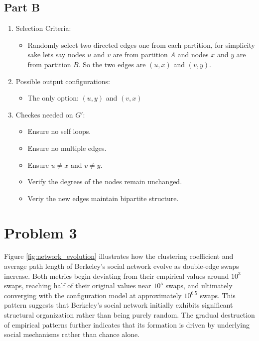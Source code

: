 \documentclass[12pt]{article}
\begin{document}
\subsection*{Part B}
\begin{enumerate}
    \item Selection Criteria:
    \begin{itemize}
        \item Randomly select two directed edges one from each partition, for simplicity sake lets say nodes \( u \) and \( v \) are from partition \( A \) and nodes \( x \) and \( y \) are from partition \( B \). So the two edges are \( (u,x) \) and \( (v,y) \).
    \end{itemize}
    \item Possible output configurations:
    \begin{itemize}
        \item The only option: \( (u, y)\) and \( (v, x) \)
    \end{itemize}
    \item Checkes needed on $G'$:   
    \begin{itemize}
        \item Ensure no self loops.
        \item Ensure no multiple edges.
        \item Ensure $u \neq x$ and $v \neq y$.
        \item Verify the degrees of the nodes remain unchanged.
        \item Veriy the new edges maintain bipartite structure.
    \end{itemize}
\end{enumerate}


\section*{Problem 3}

Figure \ref{fig:network_evolution} illustrates how the clustering coefficient and average path length of Berkeley’s social network evolve as double-edge swaps increase. Both metrics begin deviating from their empirical values around $10^3$ swaps, reaching half of their original values near $10^5$ swaps, and ultimately converging with the configuration model at approximately $10^6.5$ swaps. This pattern suggests that Berkeley’s social network initially exhibits significant structural organization rather than being purely random. The gradual destruction of empirical patterns further indicates that its formation is driven by underlying social mechanisms rather than chance alone.
\end{document}
